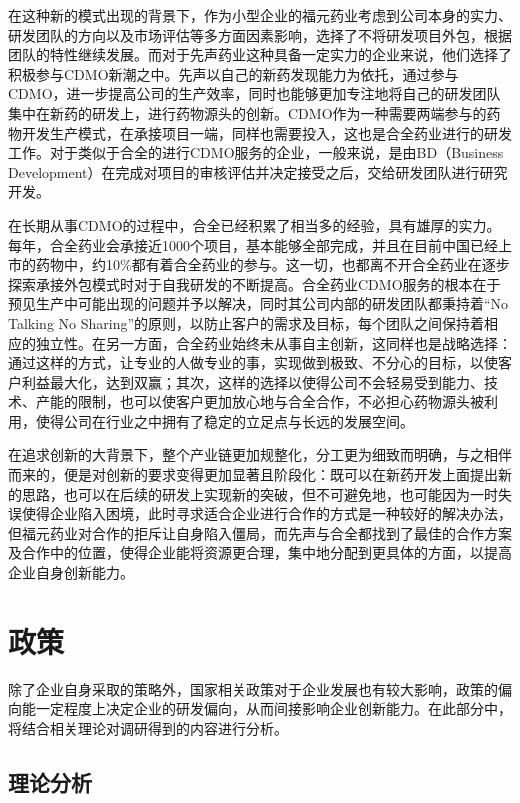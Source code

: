 \documentclass[twocolumn]{ctexbook}
\begin{document}
			在这种新的模式出现的背景下，作为小型企业的福元药业考虑到公司本身的实力、研发团队的方向以及市场评估等多方面因素影响，选择了不将研发项目外包，根据团队的特性继续发展。而对于先声药业这种具备一定实力的企业来说，他们选择了积极参与CDMO新潮之中。先声以自己的新药发现能力为依托，通过参与CDMO，进一步提高公司的生产效率，同时也能够更加专注地将自己的研发团队集中在新药的研发上，进行药物源头的创新。CDMO作为一种需要两端参与的药物开发生产模式，在承接项目一端，同样也需要投入，这也是合全药业进行的研发工作。对于类似于合全的进行CDMO服务的企业，一般来说，是由BD（Business Development）在完成对项目的审核评估并决定接受之后，交给研发团队进行研究开发。
			
			在长期从事CDMO的过程中，合全已经积累了相当多的经验，具有雄厚的实力。每年，合全药业会承接近1000个项目，基本能够全部完成，并且在目前中国已经上市的药物中，约10\%都有着合全药业的参与。这一切，也都离不开合全药业在逐步探索承接外包模式时对于自我研发的不断提高。合全药业CDMO服务的根本在于预见生产中可能出现的问题并予以解决，同时其公司内部的研发团队都秉持着“No Talking No Sharing”的原则，以防止客户的需求及目标，每个团队之间保持着相应的独立性。在另一方面，合全药业始终未从事自主创新，这同样也是战略选择：通过这样的方式，让专业的人做专业的事，实现做到极致、不分心的目标，以使客户利益最大化，达到双赢；其次，这样的选择以使得公司不会轻易受到能力、技术、产能的限制，也可以使客户更加放心地与合全合作，不必担心药物源头被利用，使得公司在行业之中拥有了稳定的立足点与长远的发展空间\citep{RN3}。
			
			
			\begin{framed}
				在追求创新的大背景下，整个产业链更加规整化，分工更为细致而明确，与之相伴而来的，便是对创新的要求变得更加显著且阶段化：既可以在新药开发上面提出新的思路，也可以在后续的研发上实现新的突破，但不可避免地，也可能因为一时失误使得企业陷入困境，此时寻求适合企业进行合作的方式是一种较好的解决办法，但福元药业对合作的拒斥让自身陷入僵局，而先声与合全都找到了最佳的合作方案及合作中的位置，使得企业能将资源更合理，集中地分配到更具体的方面，以提高企业自身创新能力。
			\end{framed}
			
			\section{政策}
			除了企业自身采取的策略外，国家相关政策对于企业发展也有较大影响，政策的偏向能一定程度上决定企业的研发偏向，从而间接影响企业创新能力。在此部分中，将结合相关理论对调研得到的内容进行分析。
			\subsection{理论分析}
\end{document}
